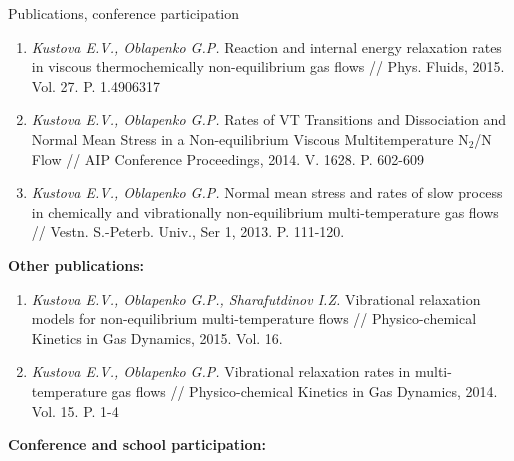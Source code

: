 \documentclass{resume} %
\begin{document}
\begin{rSection}{Publications, conference participation}
\begin{enumerate}
\item  \emph{Kustova E.V., Oblapenko G.P.} Reaction and internal energy relaxation rates in viscous thermochemically non-equilibrium gas flows // Phys. Fluids, 2015. Vol. 27. P. 1.4906317

\item  \emph{Kustova E.V., Oblapenko G.P.} Rates of VT Transitions and Dissociation and Normal Mean Stress in a Non-equilibrium Viscous Multitemperature N$_2$/N Flow // AIP Conference Proceedings, 2014. V. 1628. P. 602-609

\item  \emph{Kustova E.V., Oblapenko G.P.} Normal mean stress and rates of slow process in chemically and vibrationally non-equilibrium multi-temperature gas flows // Vestn. S.-Peterb. Univ., Ser 1, 2013. P. 111-120.

\end{enumerate}


{\bf Other publications:}

\begin{enumerate}
    \item  \emph{Kustova E.V., Oblapenko G.P., Sharafutdinov I.Z.} Vibrational relaxation models for non-equilibrium multi-temperature flows // Physico-chemical Kinetics in Gas Dynamics, 2015. Vol. 16.

    \item  \emph{Kustova E.V., Oblapenko G.P.} Vibrational relaxation rates in multi-temperature gas flows // Physico-chemical Kinetics in Gas Dynamics, 2014. Vol. 15. P. 1-4
\end{enumerate}

{\bf Conference and school participation:}


\end{rSection}
\end{document}

